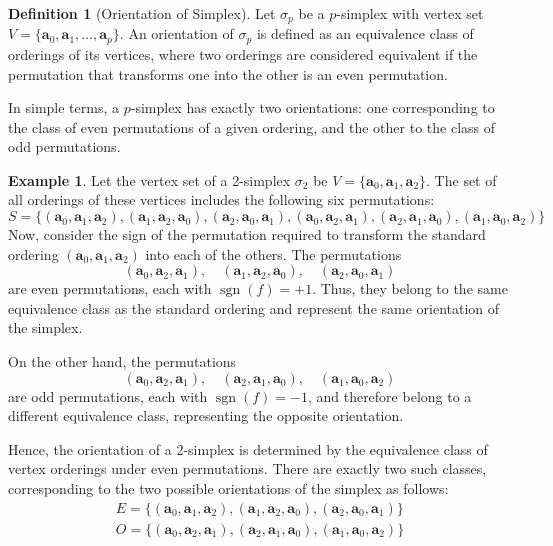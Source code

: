 \documentclass[12pt,oneside,reqno]{amsart}
\theoremstyle{plain}
\theoremstyle{definition}
\newtheorem{example}{Example}[section]
\newtheorem{definition}[theorem]{Definition}
\theoremstyle{remark}
\newcommand{\0}{{\textbf{0}}}
\begin{document}
\begin{definition}[Orientation of Simplex]\label{d:Orientation of Simplex}
Let $\sigma_p$ be a $p$-simplex with vertex set $V = \{\mathbf{a}_0, \mathbf{a}_1, \ldots, \mathbf{a}_p\}$. An  orientation of $\sigma_p$ is defined as an equivalence class of orderings of its vertices, where two orderings are considered equivalent if the permutation that transforms one into the other is an even permutation.

In simple terms, a $p$-simplex has exactly two orientations: one corresponding to the class of even permutations of a given ordering, and the other to the class of odd permutations.
\end{definition}
\begin{example}\label{eg:Orientation of a 2-Simplex}
Let the vertex set of a 2-simplex $\sigma_2$ be $V = \{\mathbf{a}_0, \mathbf{a}_1, \mathbf{a}_2\}$. The set of all orderings of these vertices includes the following six permutations:  
\[S = \{(\mathbf{a}_0, \mathbf{a}_1, \mathbf{a}_2), (\mathbf{a}_1, \mathbf{a}_2, \mathbf{a}_0),(\mathbf{a}_2, \mathbf{a}_0, \mathbf{a}_1), (\mathbf{a}_0, \mathbf{a}_2, \mathbf{a}_1), (\mathbf{a}_2, \mathbf{a}_1, \mathbf{a}_0), (\mathbf{a}_1, \mathbf{a}_0, \mathbf{a}_2)\}\]
Now, consider the sign of the permutation required to transform the standard ordering $(\mathbf{a}_0, \mathbf{a}_1, \mathbf{a}_2)$ into each of the others. The permutations
\[(\mathbf{a}_0, \mathbf{a}_2, \mathbf{a}_1), \quad
(\mathbf{a}_1, \mathbf{a}_2, \mathbf{a}_0),\quad (\mathbf{a}_2, \mathbf{a}_0, \mathbf{a}_1)
\]
are even permutations, each with $\operatorname{sgn}(f) = +1$. Thus, they belong to the same equivalence class as the standard ordering and represent the same orientation of the simplex.

On the other hand, the permutations
\[
(\mathbf{a}_0, \mathbf{a}_2, \mathbf{a}_1),\quad (\mathbf{a}_2, \mathbf{a}_1, \mathbf{a}_0),\quad (\mathbf{a}_1, \mathbf{a}_0, \mathbf{a}_2)
\]
are odd permutations, each with $\operatorname{sgn}(f) = -1$, and therefore belong to a different equivalence class, representing the opposite orientation.

Hence, the orientation of a 2-simplex is determined by the equivalence class of vertex orderings under even permutations. There are exactly two such classes, corresponding to the two possible orientations of the simplex as follows:
\begin{gather*}
E=
\{ (\mathbf{a}_0, \mathbf{a}_1, \mathbf{a}_2), (\mathbf{a}_1, \mathbf{a}_2, \mathbf{a}_0), (\mathbf{a}_2, \mathbf{a}_0, \mathbf{a}_1) \}\\ 
O =\{ (\mathbf{a}_0, \mathbf{a}_2, \mathbf{a}_1), (\mathbf{a}_2, \mathbf{a}_1, \mathbf{a}_0), (\mathbf{a}_1, \mathbf{a}_0, \mathbf{a}_2) \}
\end{gather*}
\end{example}
\end{document}
